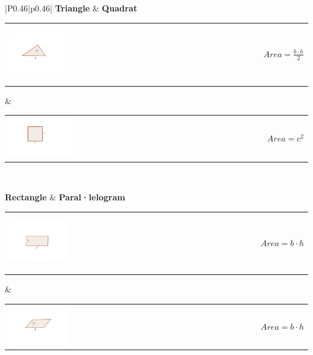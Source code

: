 \newpage
\resum \label{sec:resumarees}
\begin{center}
	\renewcommand{\arraystretch}{1.6}
	\begin{tabular}{|P{0.46\textwidth}|p{0.46\textwidth}|} \hline
		 \textbf{Triangle} &   \textbf{Quadrat} \\ \hline
			\begin{tabular}{m{}m{}}
			\begin{center} \includegraphics[width=0.25\textwidth]{img-09/triangle} \end{center} &  \begin{center} 	$Area = \frac{b\cdot h}{2}$   \end{center}
		\end{tabular}
		& 
		\begin{tabular}{m{} m{}}
			\centering \includegraphics[width=0.25\textwidth]{img-09/quadrat} &   \begin{center} $Area = c^2$ \end{center}
		\end{tabular}
		\\ \hline
		
		
			 \textbf{Rectangle} &   \textbf{Paral·lelogram} \\ \hline
		\begin{tabular}{m{}m{}}
			\begin{center} \includegraphics[width=0.25\textwidth]{img-09/rectangle} \end{center} &  \begin{center} 	$Area =b \cdot h$   \end{center}
		\end{tabular}
		& 
		\begin{tabular}{m{} m{}}
			\centering \includegraphics[width=0.25\textwidth]{img-09/parallelogram} &   \begin{center} $Area =b\cdot h$ \end{center}
		\end{tabular}
		\\ \hline
		

\end{tabular}
\end{center}
